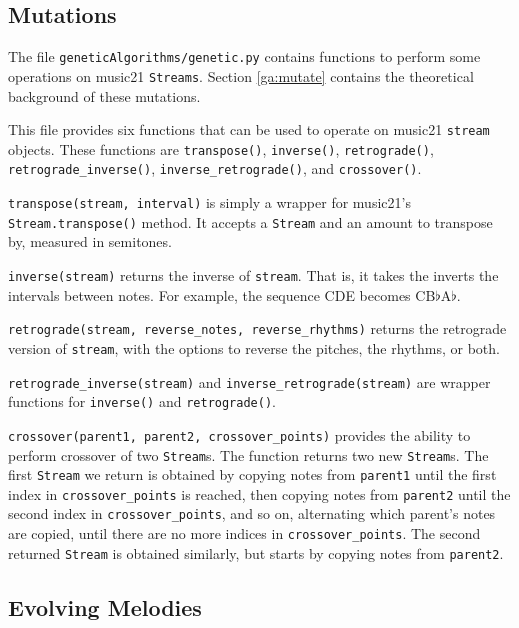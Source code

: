 \subsection{Mutations} \label{software:ga:mutations}

The file \texttt{geneticAlgorithms/genetic.py} contains functions to perform some operations on music21 \texttt{Streams}.
Section \ref{ga:mutate} contains the theoretical background of these mutations.

This file provides six functions that can be used to operate on music21 \texttt{stream} objects.
These functions are \texttt{transpose()}, \texttt{inverse()}, \texttt{retrograde()}, \texttt{retrograde\_inverse()}, \texttt{inverse\_retrograde()}, and \texttt{crossover()}.

\texttt{transpose(stream, interval)} is simply a wrapper for music21's \texttt{Stream.transpose()} method.
It accepts a \texttt{Stream} and an amount to transpose by, measured in semitones.

\texttt{inverse(stream)} returns the inverse of \texttt{stream}.
That is, it takes the inverts the intervals between notes.
For example, the sequence CDE becomes CB$\flat$A$\flat$.

\texttt{retrograde(stream, reverse\_notes, reverse\_rhythms)} returns the retrograde version of \texttt{stream}, with the options to reverse the pitches, the rhythms, or both.

\texttt{retrograde\_inverse(stream)} and \texttt{inverse\_retrograde(stream)} are wrapper functions for \texttt{inverse()} and \texttt{retrograde()}.

\texttt{crossover(parent1, parent2, crossover\_points)} provides the ability to perform crossover of two \texttt{Stream}s.
The function returns two new \texttt{Stream}s.
The first \texttt{Stream} we return is obtained by copying notes from \texttt{parent1} until the first index in \texttt{crossover\_points} is reached, then copying notes from \texttt{parent2} until the second index in \texttt{crossover\_points}, and so on, alternating which parent's notes are copied, until there are no more indices in \texttt{crossover\_points}.
The second returned \texttt{Stream} is obtained similarly, but starts by copying notes from \texttt{parent2}.

\subsection{Evolving Melodies} \label{software:ga:evolving}

